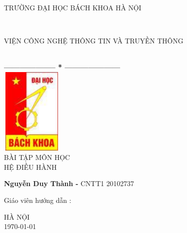 \documentclass[a4paper,12pt]{report}
\begin{document}
\thispagestyle{empty}
\thisfancypage{
\setlength{\fboxsep}{0pt}
\fbox}{} 
\begin{center}
    \begin{large}
        \textcolor[rgb]{1.00,0.00,0.00}{TRƯỜNG ĐẠI HỌC BÁCH KHOA HÀ NỘI}
    \end{large} \\
    \begin{large}
        \textcolor[rgb]{1.00,0.00,0.00}{VIỆN CÔNG NGHỆ THÔNG TIN VÀ TRUYỀN THÔNG}
    \end{large} \\

    \textbf{--------------------  *  ---------------------}\\[2cm]

    \includegraphics[width=3cm, height=4.2cm]{logo}\\[1cm]
    {\fontsize{32pt}{1}\selectfont BÀI TẬP MÔN HỌC}\\
    {\fontsize{20pt}{1}\selectfont HỆ ĐIỀU HÀNH}\\[2cm]
\end{center}

\begin{flushright}
    \parbox[t]{8cm}{
    \textbf{Nguyễn Duy Thành - }CNTT1 20102737\\}%
\end{flushright}

\hspace{5cm} Giáo viên hướng dẫn\hspace{24pt} :
\begin{flushright} \textbf{\parbox[t]{8cm}{    
        \textcolor[rgb]{0.00,0.00,1.00}{Phạm Đăng Hải}
        }}
\end{flushright}
    \vspace{2cm}
\begin{center}
        {\fontsize{16pt}{1}\selectfont HÀ NỘI}\\
        {\fontsize{16pt}{1}\today}
\end{center}
\end{document}
